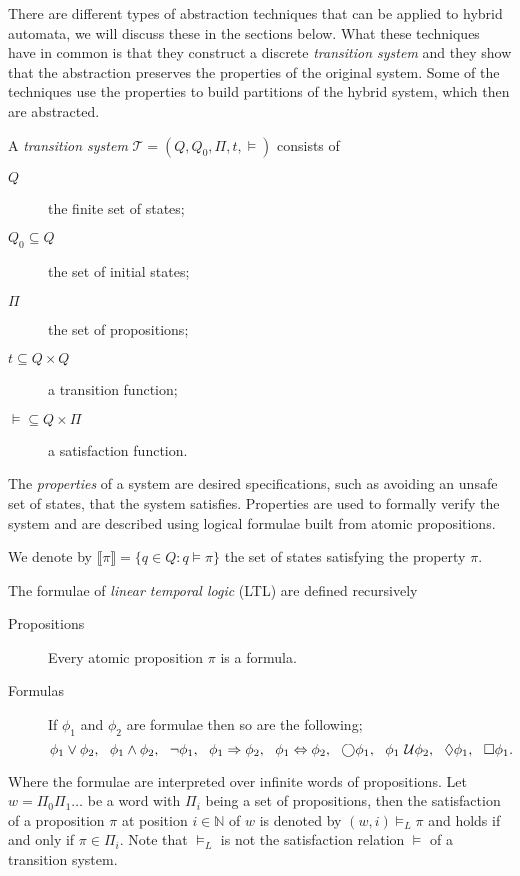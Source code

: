 There are different types of abstraction techniques that can be applied to hybrid automata, we will discuss these in the sections below. What these techniques have in common is that they construct a discrete \emph{transition system} and they show that the abstraction preserves the properties of the original system. Some of the techniques use the properties to build partitions of the hybrid system, which then are abstracted.

\begin{defi}
A \emph{transition system} $\mathcal{T}=(Q,Q_{0},\Pi,t,\models)$ consists of
\begin{description}
    \item[$Q$]{the finite set of states;}
    \item[$Q_{0}\subseteq Q$]{the set of initial states;}
    \item[$\Pi$]{the set of propositions;}
    \item[$t \subseteq Q\times Q$]{a transition function;}
    \item[$\models\subseteq Q\times\Pi$]{a satisfaction function.}
\end{description}
\end{defi}

The \emph{properties} of a system are desired specifications, such as avoiding an unsafe set of states, that the system satisfies. Properties are used to formally verify the system and are described using logical formulae built from atomic propositions.

We denote by $\llbracket \pi \rrbracket = \{ q\in Q : q\models \pi\}$ the set of states satisfying the property $\pi$.

\begin{defi}
The formulae of \emph{linear temporal logic} (LTL) are defined recursively
\begin{description}
    \item[Propositions]{Every atomic proposition $\pi$ is a formula.}
    \item[Formulas]{If $\phi_{1}$ and $\phi_{2}$ are formulae then so are the following;
        \[
        \phi_{1} \lor \phi_{2},\ \ \phi_{1} \land \phi_{2}, \ \ \lnot \phi_{1}, \ \
        \phi_{1} \Rightarrow \phi_{2},\ \ \phi_{1} \Leftrightarrow \phi_{2}, \ \ \bigcirc \phi_{1}, \ \ \phi_{1} \until \phi_{2}, \ \ \lozenge \phi_{1}, \ \ \square \phi_{1}.
        \]}
\end{description}
\end{defi}
Where the formulae are interpreted over infinite words of propositions. Let $w=\Pi_{0}\Pi_{1}\ldots$ be a word with $\Pi_{i}$ being a set of propositions, then the satisfaction of a proposition $\pi$ at position $i\in \mathbb{N}$ of $w$ is denoted by $(w,i)\models_{L} \pi$ and holds if and only if $\pi \in \Pi_{i}$. Note that $\models_{L}$ is not the satisfaction relation $\models$ of a transition system.

